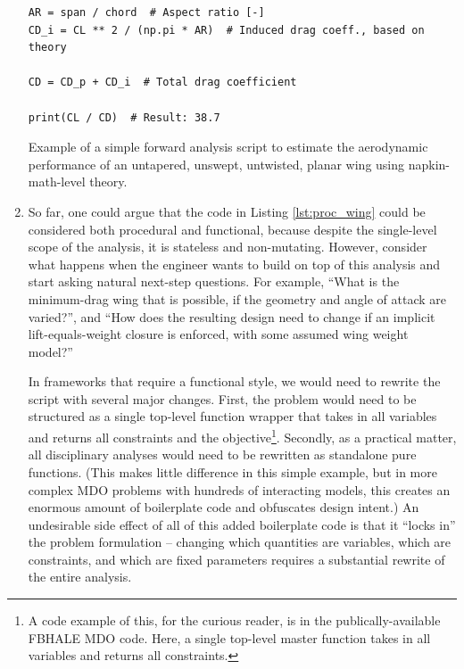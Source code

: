 \begin{enumerate}
\begin{listing}[H]
\begin{verbatim}
AR = span / chord  # Aspect ratio [-]
CD_i = CL ** 2 / (np.pi * AR)  # Induced drag coeff., based on theory

CD = CD_p + CD_i  # Total drag coefficient

print(CL / CD)  # Result: 38.7
        \end{verbatim}
        \caption{Example of a simple forward analysis script to estimate the aerodynamic performance of an untapered, unswept, untwisted, planar wing using napkin-math-level theory.}
        \label{lst:proc_wing}
    \end{listing}

    \item So far, one could argue that the code in Listing \ref{lst:proc_wing} could be considered both procedural and functional, because despite the single-level scope of the analysis, it is stateless and non-mutating. However, consider what happens when the engineer wants to build on top of this analysis and start asking natural next-step questions. For example, ``What is the minimum-drag wing that is possible, if the geometry and angle of attack are varied?'', and ``How does the resulting design need to change if an implicit lift-equals-weight closure is enforced, with some assumed wing weight model?''

    In frameworks that require a functional style, we would need to rewrite the script with several major changes. First, the problem would need to be structured as a single top-level function wrapper that takes in all variables and returns all constraints and the objective\footnote{A code example of this, for the curious reader, is in the publically-available FBHALE MDO code. Here, a single top-level master function takes in all variables and returns all constraints.}. Secondly, as a practical matter, all disciplinary analyses would need to be rewritten as standalone pure functions. (This makes little difference in this simple example, but in more complex MDO problems with hundreds of interacting models, this creates an enormous amount of boilerplate code and obfuscates design intent.) An undesirable side effect of all of this added boilerplate code is that it ``locks in'' the problem formulation -- changing which quantities are variables, which are constraints, and which are fixed parameters requires a substantial rewrite of the entire analysis.


\end{enumerate}
